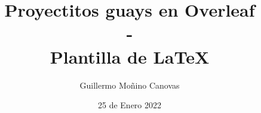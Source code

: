 \documentclass[a4paper,12pt, titlepage, openany]{article}
\title{\textbf{Proyectitos guays en Overleaf \\ - \\ Plantilla de LaTeX}}
\author{Guillermo Moñino Canovas}
\date{25 de Enero 2022}
\begin{document}
\let\originalnewpage\newpage
\let\newpage\relax
\maketitle
\let\newpage\originalnewpage








\end{document}
